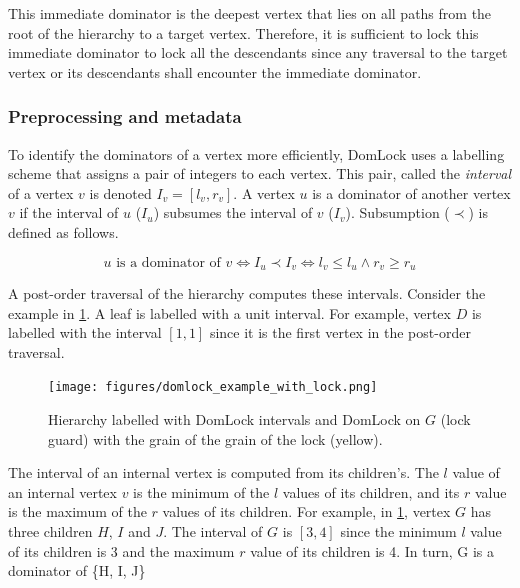 This immediate dominator is the deepest vertex that lies on all paths from the root of the hierarchy to a target vertex. Therefore, it is sufficient to lock this immediate dominator to lock all the descendants since any traversal to the target vertex or its descendants shall encounter the immediate dominator.

\subsubsection{Preprocessing and metadata}

To identify the dominators of a vertex more efficiently, DomLock uses a labelling scheme that assigns a pair of integers to each vertex. This pair, called the \emph{interval} of a vertex $v$ is denoted  $I_v = [l_v, r_v]$. 
A vertex $u$ is a dominator of another vertex $v$ if the interval of $u$ ($I_u$) subsumes the interval of $v$ ($I_v$). Subsumption ($\prec$) is defined as follows.


\begin{equation*}
    u \text{ is a dominator of } v \iff I_u \prec I_v \iff l_v \leq l_u \land r_v \geq r_u
\end{equation*}


A post-order traversal of the hierarchy computes these intervals. Consider the example in \cref{fig:domlock_example_locked}. A leaf is labelled with a unit interval. For example, vertex $D$ is labelled with the interval $[1, 1]$ since it is the first vertex in the post-order traversal.  

\begin{figure}
    \centering
    \captionsetup{justification=centering}
    \texttt{[image: figures/domlock\_example\_with\_lock.png]}
    \caption{Hierarchy labelled with DomLock intervals and DomLock on $G$ (lock guard) with the grain of the grain of the lock (yellow).}
    \label{fig:domlock_example_locked}
\end{figure}

The interval of an internal vertex is computed from its children's. The $l$ value of an internal vertex $v$ is the minimum of the $l$ values of its children, and its $r$ value is the maximum of the $r$ values of its children. For example, in \cref{fig:domlock_example_locked}, vertex $G$ has three children $H$, $I$ and $J$. The interval of $G$ is $[3,4]$ since the minimum $l$ value of its children is 3 and the maximum $r$ value of its children is 4. In turn, G is a dominator of \{H, I, J\}

